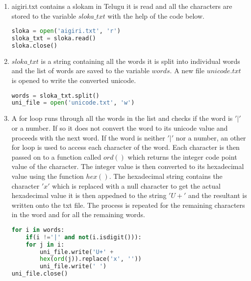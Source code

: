 \renewcommand{\theequation}{\theenumi}
\begin{enumerate}[label=\thesection.\arabic*.,ref=\thesection.\theenumi]

\item aigiri.txt contains a slokam in Telugu it is read and all the characters are stored to the variable $sloka\_txt$ with the help of the code below.
\begin{lstlisting}[language=Python]
sloka = open('aigiri.txt', 'r') 
sloka_txt = sloka.read() 
sloka.close()
\end{lstlisting}

\item $sloka\_txt$ is a string containing all the words it is split into individual words and the list of words are saved to the variable $words$. A new file $unicode.txt$ is opened to write the converted unicode.
\begin{lstlisting}[language=Python]
words = sloka_txt.split() 
uni_file = open('unicode.txt', 'w')
\end{lstlisting}

\item A  for loop runs through all the words in the list and checks if the word is $'|'$ or a number. If so it does not convert the word to its unicode value and proceeds with the next word. If the word is neither $'|'$ nor a number, an other for loop is used to access each character of the word. Each character is then passed on to a function called $ord()$ which returns the integer code point value of the character. The integer value is then converted to its hexadecimal value using the function $hex()$. The hexadecimal string contains the character $'x'$ which is replaced with a null character to get the actual hexadecimal value it is then appedned to the string $'U+'$ and the resultant is written onto the txt file. The process is repeated for the remaining characters in the word and for all the remaining words.
\begin{lstlisting}[language=Python]
for i in words:
	if(i !='|' and not(i.isdigit())):
	for j in i:
		uni_file.write('U+' + 
		hex(ord(j)).replace('x', ''))
		uni_file.write(' ') 
uni_file.close()
\end{lstlisting} 

\end{enumerate}
